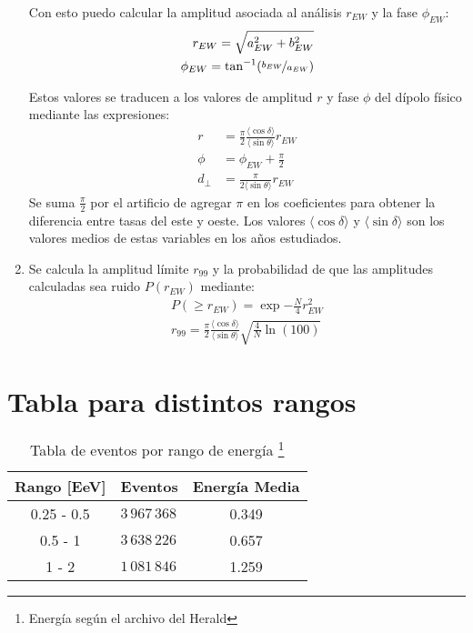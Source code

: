 \begin{enumerate}
    Con esto puedo calcular la amplitud asociada al análisis $r_{EW}$ y la fase $\phi_{EW}$:
    \begin{align*}
        r_{EW} = \sqrt{a_{EW}^2 + b_{EW}^2}\\
        \phi_{EW} = \tan^{-1}(\nicefrac{b_{EW}}{a_{EW}})
    \end{align*}

    Estos valores se traducen a los valores de amplitud $r$ y fase $\phi$ del dípolo físico mediante las expresiones:
    \begin{align*}
        r &= \frac{\pi}{2} \frac{\langle\cos\delta \rangle}{\langle\sin\theta \rangle} r_{EW}\\
        \phi &= \phi_{EW} + \frac{\pi}{2}\\
        d_\perp&= \frac{\pi}{2 \langle\sin\theta \rangle} r_{EW}
    \end{align*}
    Se suma $\frac{\pi}{2}$ por el  artificio de agregar $\pi$ en los coeficientes para obtener la diferencia entre tasas del este y oeste. Los valores $\langle\cos\delta \rangle$ y $\langle\sin\delta \rangle$ son los valores medios de estas variables en los años estudiados. 

    \item Se calcula la amplitud límite $r_{99}$ y la probabilidad de que las amplitudes calculadas sea ruido  $P(r_{EW})$ mediante:
    \begin{align*}
        P(\geq r_{EW}) = \exp{-\frac{N}{4}r^2_{EW}}\\
        r_{99} = \frac{\pi}{2} \frac{\langle\cos\delta \rangle}{\langle\sin\theta \rangle}\sqrt{\frac{4}{N}\ln(100)}
    \end{align*}

\end{enumerate}

\section*{Tabla para distintos rangos}
\begin{table}[H]
    \begin{small}
        \begin{center}
            \begin{tabular}[c]{c|l|c}
                \multicolumn{1}{c|}{\textbf{Rango [EeV]}} & 
                \multicolumn{1}{c|}{\textbf{Eventos}} 
                & \bf{Energía Media} \\
                \hline
                0.25 - 0.5  & $3\,967\,368$ & 0.349\\
                0.5  - 1    & $3\,638\,226$ & 0.657\\
                1    - 2    & $1\,081\,846$ & 1.259 \\
            \end{tabular}
            \caption{Tabla de eventos por rango de energía \footnote{Energía según el archivo del Herald}}
            \label{tab:}
        \end{center}
    \end{small}
\end{table}


